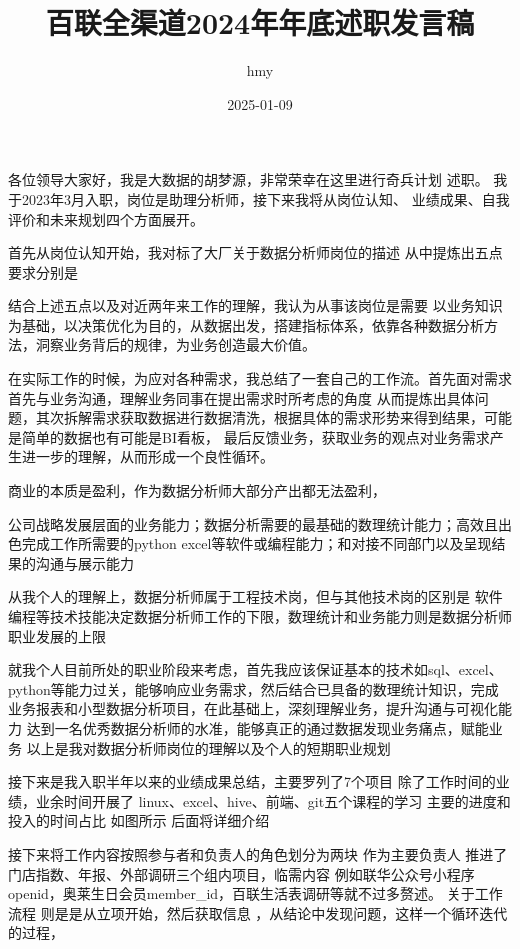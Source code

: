 \documentclass[a4paper]{article}
\title{百联全渠道2024年年底述职发言稿}
\author{hmy}
\date{2025-01-09}
\begin{document}
\maketitle
\newpage
各位领导大家好，我是大数据的胡梦源，非常荣幸在这里进行奇兵计划
述职。
我于2023年3月入职，岗位是助理分析师，接下来我将从岗位认知、
业绩成果、自我评价和未来规划四个方面展开。
\par

首先从岗位认知开始，我对标了大厂关于数据分析师岗位的描述
从中提炼出五点要求分别是

结合上述五点以及对近两年来工作的理解，我认为从事该岗位是需要 以业务知识为基础，以决策优化为目的，从数据出发，搭建指标体系，依靠各种数据分析方法，洞察业务背后的规律，为业务创造最大价值。

在实际工作的时候，为应对各种需求，我总结了一套自己的工作流。首先面对需求首先与业务沟通，理解业务同事在提出需求时所考虑的角度
从而提炼出具体问题，其次拆解需求获取数据进行数据清洗，根据具体的需求形势来得到结果，可能是简单的数据也有可能是BI看板，
最后反馈业务，获取业务的观点对业务需求产生进一步的理解，从而形成一个良性循环。

商业的本质是盈利，作为数据分析师大部分产出都无法盈利，


公司战略发展层面的业务能力；数据分析需要的最基础的数理统计能力；高效且出色完成工作所需要的python excel等软件或编程能力；和对接不同部门以及呈现结果的沟通与展示能力

从我个人的理解上，数据分析师属于工程技术岗，但与其他技术岗的区别是
软件编程等技术技能决定数据分析师工作的下限，数理统计和业务能力则是数据分析师职业发展的上限

就我个人目前所处的职业阶段来考虑，首先我应该保证基本的技术如sql、excel、python等能力过关，能够响应业务需求，然后结合已具备的数理统计知识，完成业务报表和小型数据分析项目，在此基础上，深刻理解业务，提升沟通与可视化能力 达到一名优秀数据分析师的水准，能够真正的通过数据发现业务痛点，赋能业务
以上是我对数据分析师岗位的理解以及个人的短期职业规划

接下来是我入职半年以来的业绩成果总结，主要罗列了7个项目
除了工作时间的业绩，业余时间开展了 linux、excel、hive、前端、git五个课程的学习
主要的进度和投入的时间占比 如图所示 后面将详细介绍

接下来将工作内容按照参与者和负责人的角色划分为两块
作为主要负责人 推进了门店指数、年报、外部调研三个组内项目，临需内容 例如联华公众号小程序 openid，奥莱生日会员member_id，百联生活表调研等就不过多赘述。
关于工作流程 则是是从立项开始，然后获取信息         ，从结论中发现问题，这样一个循环迭代的过程，
\end{document}
